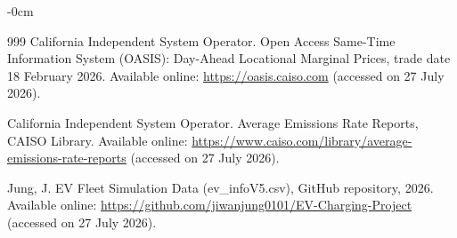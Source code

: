 \documentclass[sustainability,article,submit,moreauthors,pdftex]{Definitions/mdpi}
\begin{document}
\begin{adjustwidth}{-\extralength}{0cm}
\begin{thebibliography}{999}
California Independent System Operator.
Open Access Same-Time Information System (OASIS): Day-Ahead Locational
Marginal Prices, trade date 18 February 2026.
Available online: \url{https://oasis.caiso.com}
(accessed on 27 July 2026).

California Independent System Operator.
Average Emissions Rate Reports, CAISO Library.
Available online: \url{https://www.caiso.com/library/average-emissions-rate-reports}
(accessed on 27 July 2026).

Jung, J.
EV Fleet Simulation Data (ev\_infoV5.csv), GitHub repository, 2026.
Available online: \url{https://github.com/jiwanjung0101/EV-Charging-Project}
(accessed on 27 July 2026).

\end{thebibliography}

% 

\end{adjustwidth}
\end{document}

